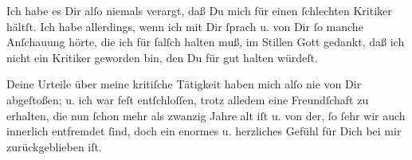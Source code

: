 \pstart
           Ich habe es Dir alſo niemals verargt, daß Du mich für einen ſchlechten Kritiker
               hältſt. Ich habe allerdings, wenn ich mit Dir ſprach u. von Dir ſo manche Anſchauung
               hörte, die ich für falſch halten muß, im Stillen Gott gedankt, daß ich nicht ein
               Kritiker geworden bin, den Du für gut halten würdeſt.\pend
           
\pstart
           {\pb}Deine Urteile über meine kritiſche Tätigkeit
               haben mich alſo nie von Dir abgeſtoßen; u. ich war feſt entſchloſſen, trotz alledem
                  \strikeout{\textcolor{gray}{Dir}} eine Freundſchaft zu erhalten, die nun ſchon mehr als zwanzig Jahre alt
                  iſt\strikeout{,} u. von der, ſo ſehr wir auch innerlich
               entfremdet ſind, doch ein enormes u. herzliches Gefühl für Dich bei mir
               zurückgeblieben iſt.\strikeout{\textcolor{gray}{×}}\pend
           
